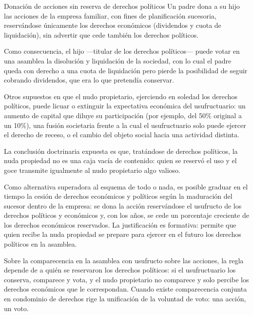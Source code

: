 \documentclass[12pt,oneside]{book}
\begin{document}
\begin{example}{Donación de acciones sin reserva de derechos políticos}
Un padre dona a su hijo las acciones de la empresa familiar, con fines de planificación sucesoria, reservándose únicamente los derechos económicos (dividendos y cuota de liquidación), sin advertir que cede también los derechos políticos.

Como consecuencia, el hijo ---titular de los derechos políticos--- puede votar en una asamblea la disolución y liquidación de la sociedad, con lo cual el padre queda con derecho a una cuota de liquidación pero pierde la posibilidad de seguir cobrando dividendos, que era lo que pretendía conservar.

Otros supuestos en que el nudo propietario, ejerciendo en soledad los derechos políticos, puede licuar o extinguir la expectativa económica del usufructuario: un aumento de capital que diluye su participación (por ejemplo, del 50\% original a un 10\%), una fusión societaria frente a la cual el usufructuario solo puede ejercer el derecho de receso, o el cambio del objeto social hacia una actividad distinta.
\end{example}

La conclusión doctrinaria expuesta es que, tratándose de derechos políticos, la nuda propiedad no es una caja vacía de contenido: quien se reservó el uso y el goce transmite igualmente al nudo propietario algo valioso.

\begin{note}
Como alternativa superadora al esquema de todo o nada, es posible graduar en el tiempo la cesión de derechos económicos y políticos según la maduración del sucesor dentro de la empresa: se dona la acción reservándose el usufructo de los derechos políticos y económicos y, con los años, se cede un porcentaje creciente de los derechos económicos reservados. La justificación es formativa: permite que quien recibe la nuda propiedad se prepare para ejercer en el futuro los derechos políticos en la asamblea.
\end{note}

Sobre la comparecencia en la asamblea con usufructo sobre las acciones, la regla depende de a quién se reservaron los derechos políticos: si el usufructuario los conserva, comparece y vota, y el nudo propietario no comparece y solo percibe los derechos económicos que le correspondan. Cuando existe comparecencia conjunta en condominio de derechos rige la unificación de la voluntad de voto: una acción, un voto.
\end{document}
